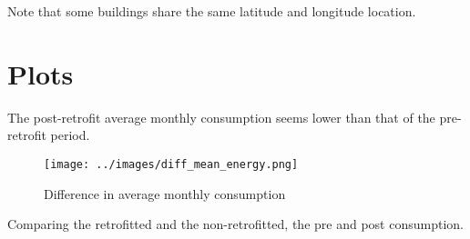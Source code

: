 \documentclass[12pt]{article}
\begin{document}
Note that some buildings share the same latitude and longitude location.
\section{Plots}
The post-retrofit average monthly consumption seems lower than that of the
pre-retrofit period.
\begin{figure}[H]
  \centering
  \texttt{[image: ../images/diff\_mean\_energy.png]}
  \caption{Difference in average monthly consumption}
\end{figure}

Comparing the retrofitted and the non-retrofitted, the pre and post consumption.

\newpage

% 
\end{document}
